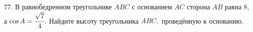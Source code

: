 77. В равнобедренном треугольнике $ABC$ с основанием $AC$ сторона $AB$ равна 8, а $\cos A=\cfrac{\sqrt{7}}{4}.$ Найдите высоту треугольника $ABC,$ проведённую к основанию.\\
